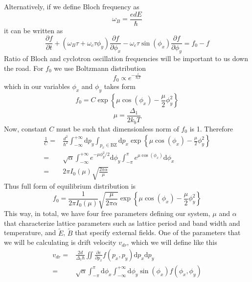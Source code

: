 \documentclass[40pt,letterpaper,physrev]{article}
\begin{document}
   Alternatively, if we define Bloch frequency as
   \begin{equation}
	\omega_B=\frac{edE}{\hbar}
   \end{equation}
   it can be written as 
   \begin{equation}
     \frac{\partial f}{\partial t}+
     \left ( \omega_B\tau+\omega_c\tau\phi_y\right ) \frac{\partial f}{\partial\phi_x}-
     \omega_c\tau\sin(\phi_x)\frac{\partial f}{\partial\phi_y}
     = f_0 - f
   \end{equation} 
    Ratio of Bloch and cyclotron oscillation frequencies will be important to us down the road.
    For $f_0$ we use Boltzmann distribution 
    \begin{equation}
        f_0\propto e^{\displaystyle -\frac{\varepsilon}{k_bT}}
    \end{equation}
    which in our variables $\phi_x$ and $\phi_y$ takes form
    \begin{equation}
	f_0=C\exp{\left \{ \mu\cos(\phi_x)-\frac{\mu}{2}\phi^2_y\right \} }
	\end{equation}
	\begin{equation}
	\boxed{\mu=\frac{\Delta_1}{2k_{b}T}}
    \end{equation} 
    Now, constant $C$ must be such that dimensionless norm of $f_0$ is 1. Therefore
    \begin{align}
       \frac{1}{C}=&\frac{d^2}
	{\hbar^2}\int^{+\infty}_{-\infty}\text{d}p_y\int_{p_x\in\text{BZ}}\text{d}p_x
	\exp{\left \{ \mu\cos(\phi_x)-\frac{\mu}{2}\phi^2_y\right \} } \\
	   =&\sqrt{\alpha}\int^{+\infty}_{-\infty}e^{-\mu\phi^2_y/2}\text{d}\phi_y
	   \int^{\pi}_{-\pi}e^{\mu\cos(\phi_x)}\text{d}\phi_x \\
	   =&2\pi I_0(\mu)\sqrt{\frac{2\pi\alpha}{\mu}}
    \end{align}
    Thus full form of equilibrium distribution is
    \begin{equation}
    \boxed{
	f_0=\frac{1}{2\pi I_0(\mu)}\sqrt{\frac{\mu}{2\pi\alpha}}\exp{\left \{ \mu\cos(\phi_x)-\frac{\mu}{2}\phi^2_y\right \} } }
	\end{equation}
	This way, in total, we have four free parameters defining our system, $\mu$ and $\alpha$ that characterize lattice parameters such as lattice period and band width and temperature, and $\tilde{E}$, $\tilde{B}$ that specify external fields.
	One of the parameters that we will be calculating is drift 
	velocity $v_{dr}$, which we will define like this
	\begin{align}
		v_{dr}=&\frac{2d}{\Delta_1\hbar}\iint
			\frac{\partial\varepsilon}{\partial p_x}f(p_x,p_y)\text{d}p_x\text{d}p_y \\
			=&\sqrt{\alpha}\int^{\pi}_{-\pi}\text{d}\phi_x\int^{+\infty}_{-\infty}\text{d}\phi_y\sin(\phi_x)f(\phi_x,\phi_y)\label{eq:v_dr_generic}
	\end{align}
\end{document}
